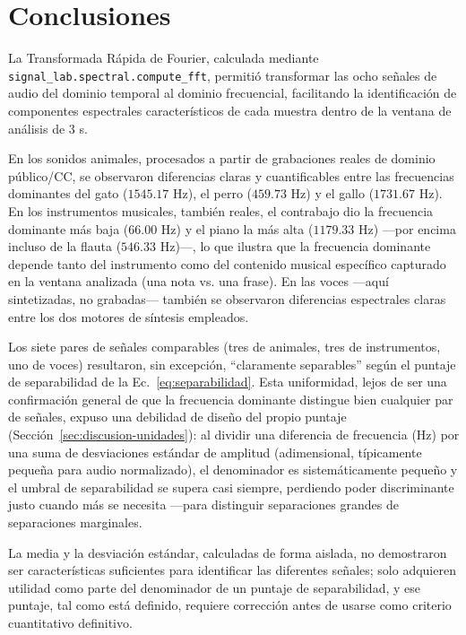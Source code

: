 
\section{Conclusiones}

La Transformada Rápida de Fourier, calculada mediante \texttt{signal\_lab.spectral.compute\_fft}, permitió transformar las ocho señales de audio del dominio temporal al dominio frecuencial, facilitando la identificación de componentes espectrales característicos de cada muestra dentro de la ventana de análisis de 3 s.

En los sonidos animales, procesados a partir de grabaciones reales de dominio público/CC, se observaron diferencias claras y cuantificables entre las frecuencias dominantes del gato ($1545.17$ Hz), el perro ($459.73$ Hz) y el gallo ($1731.67$ Hz). En los instrumentos musicales, también reales, el contrabajo dio la frecuencia dominante más baja ($66.00$ Hz) y el piano la más alta ($1179.33$ Hz) —por encima incluso de la flauta ($546.33$ Hz)—, lo que ilustra que la frecuencia dominante depende tanto del instrumento como del contenido musical específico capturado en la ventana analizada (una nota vs. una frase). En las voces —aquí sintetizadas, no grabadas— también se observaron diferencias espectrales claras entre los dos motores de síntesis empleados.

Los siete pares de señales comparables (tres de animales, tres de instrumentos, uno de voces) resultaron, sin excepción, ``claramente separables'' según el puntaje de separabilidad de la Ec.~\ref{eq:separabilidad}. Esta uniformidad, lejos de ser una confirmación general de que la frecuencia dominante distingue bien cualquier par de señales, expuso una debilidad de diseño del propio puntaje (Sección~\ref{sec:discusion-unidades}): al dividir una diferencia de frecuencia (Hz) por una suma de desviaciones estándar de amplitud (adimensional, típicamente pequeña para audio normalizado), el denominador es sistemáticamente pequeño y el umbral de separabilidad se supera casi siempre, perdiendo poder discriminante justo cuando más se necesita —para distinguir separaciones grandes de separaciones marginales.

La media y la desviación estándar, calculadas de forma aislada, no demostraron ser características suficientes para identificar las diferentes señales; solo adquieren utilidad como parte del denominador de un puntaje de separabilidad, y ese puntaje, tal como está definido, requiere corrección antes de usarse como criterio cuantitativo definitivo.

